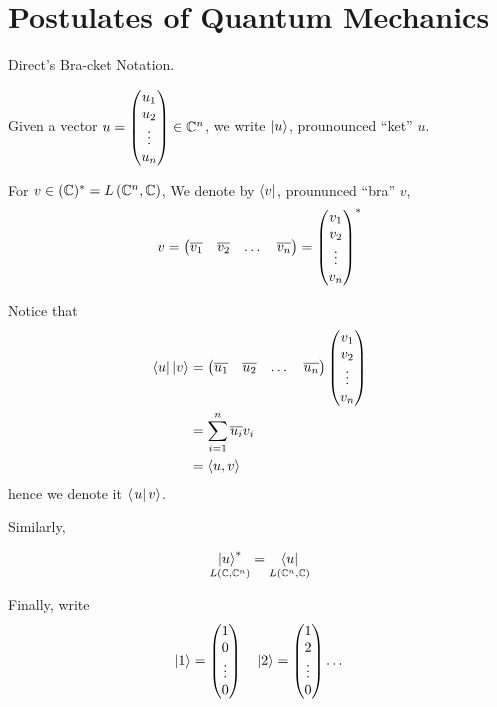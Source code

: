 \section{Postulates of Quantum Mechanics}

Direct's Bra-cket Notation.

Given a vector $u = \begin{pmatrix}u_1\\u_2\\\vdots\\u_n\end{pmatrix}\in\mathbb{C}^n$,
we write $\left|u\right\rangle$, prounounced ``ket'' $u$.

For $v \in (\mathbb{C})^* = L\left(\mathbb{C}^n,\mathbb{C}\right)$, We denote by $\left\langle v\right|$, proununced ``bra'' $v$,
\[v = \begin{pmatrix}\overline{v_1}&\overline{v_2}&\dots&\overline{v_n}\end{pmatrix} = \begin{pmatrix}v_1\\v_2\\\vdots\\v_n\end{pmatrix}^*\]

Notice that
\begin{align*}\left\langle u\right|\left|v\right\rangle
     & = \begin{pmatrix}\overline{u_1}&\overline{u_2}&\dots&\overline{u_n}\end{pmatrix}\begin{pmatrix}v_1\\v_2\\\vdots\\v_n\end{pmatrix} \\
     & = \sum_{i=1}^n\overline{u_i}v_i                          \\
     & = \left\langle u, v\right\rangle
\end{align*}
hence we denote it $\left\langle \left.u\right|v\right\rangle$.

Similarly,

\[\underset{L\left(\mathbb{C},\mathbb{C}^n\right)}{\left|u\right\rangle^*} = \underset{L\left(\mathbb{C}^n,\mathbb{C}\right)}{\left\langle u\right|}\]

Finally, write
\[\left|1\right\rangle = \begin{pmatrix}1\\0\\\vdots\\0\end{pmatrix}\quad\left|2\right\rangle = \begin{pmatrix}1\\2\\\vdots\\0\end{pmatrix} \dots\]

